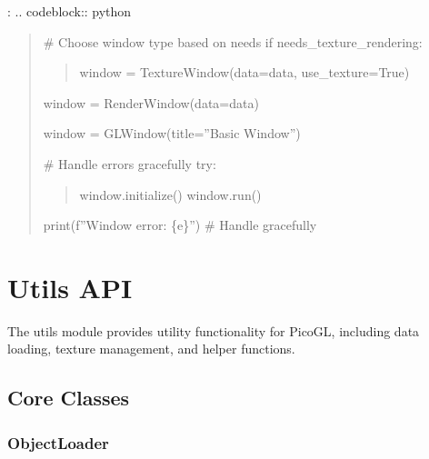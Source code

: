 \documentclass[a4paper,10pt,english,openany,oneside]{sphinxmanual}
\begin{document}
\sphinxAtStartPar
{}:
.. code\sphinxhyphen{}block:: python
\begin{quote}

\sphinxAtStartPar
\# Choose window type based on needs
if needs\_texture\_rendering:
\begin{quote}

\sphinxAtStartPar
window = TextureWindow(data=data, use\_texture=True)
\end{quote}
\begin{description}
\sphinxAtStartPar
window = RenderWindow(data=data)

\sphinxAtStartPar
window = GLWindow(title=”Basic Window”)

\end{description}

\sphinxAtStartPar
\# Handle errors gracefully
try:
\begin{quote}

\sphinxAtStartPar
window.initialize()
window.run()
\end{quote}
\begin{description}
\sphinxAtStartPar
print(f”Window error: \{e\}”)
\# Handle gracefully

\end{description}
\end{quote}

\sphinxstepscope


\section{Utils API}
\label{\detokenize{api/utils:utils-api}}\label{\detokenize{api/utils::doc}}
\sphinxAtStartPar
The utils module provides utility functionality for PicoGL, including data loading, texture management, and helper functions.


\subsection{Core Classes}
\label{\detokenize{api/utils:core-classes}}

\subsubsection{ObjectLoader}
\label{\detokenize{api/utils:objectloader}}
\end{document}
